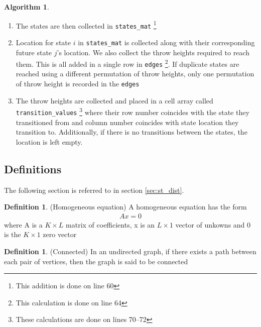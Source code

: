 \documentclass{article}
\theoremstyle{definition}
\newtheorem{definition}[theorem]{Definition}
\newtheorem{algorithm}[theorem]{Algorithm}
\theoremstyle{remark}
\numberwithin{equation}{section}
\begin{document}
\begin{algorithm}
\begin{enumerate}
\begin{enumerate}
            \item The above is extended to the case where there are three balls with both the remaining balls thrown to a height of 1 each \footnote{These calculations can be seen on lines 45--52 }
            \end{enumerate}
        \item The states are then collected in \lstinline|states_mat| \footnote{This addition is done on line 60 }
        \item Location for state $i$ in \lstinline|states_mat| is collected along with their corresponding future state $j$'s location. We also collect the throw heights required to reach them. This is all added in a single row in \lstinline|edges| \footnote{This calculation is done on line 64 }. If duplicate states are reached using a different permutation of throw heights, only one permutation of throw height is recorded in the \lstinline|edges| 
        \item The throw heights are collected and placed in a cell array called \lstinline|transition_values| \footnote{These calculations are done on lines 70--72 } where their row number coincides with the state they transitioned from and column number coincides with state location they transition to. Additionally, if there is no transitions between the states, the location is left empty.
    \end{enumerate}
\end{algorithm}


\subsection{Definitions}
The following section is referred to in section \ref{sec:st_dist}.

\begin{definition} (Homogeneous equation)
    \label{defn:homo_eqn} A homogeneous equation has the form
    \begin{align}
        \label{eqn:homo_eqn} Ax = 0
    \end{align}
where A is a $K \times L$ matrix of coefficients, x is an $L \times 1$ vector of unkowns and 0 is the $K \times 1$ zero vector
\end{definition}

\begin{definition} (Connected) \label{defn:connected}
 In an undirected graph, if there exists a path between each pair of vertices, then the graph is said to be connected \cite[p.1746]{MarkovChains}
\end{definition}
\end{document}
